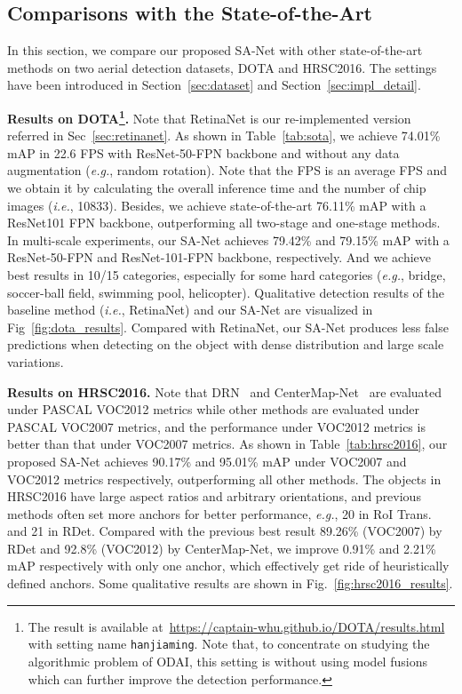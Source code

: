 \documentclass[10pt,journal,final]{IEEEtran}
\def\eg{{\em e.g.}}
\def\ie{{\em i.e.}}
\begin{document}
\subsection{Comparisons with the State-of-the-Art}
In this section, we compare our proposed SA-Net with other state-of-the-art methods on two aerial detection datasets, DOTA and HRSC2016. The settings have been introduced in Section~\ref{sec:dataset} and Section~\ref{sec:impl_detail}. 

{\bf Results on DOTA\footnote{The result is available at~\url{https://captain-whu.github.io/DOTA/results.html} with setting name \texttt{hanjiaming}. Note that, to concentrate on studying the algorithmic problem of ODAI, this setting is without using model fusions which can further improve the detection performance.}.} 
Note that RetinaNet is our re-implemented version referred in Sec~\ref{sec:retinanet}. As shown in Table~\ref{tab:sota}, we achieve 74.01\% mAP in 22.6 FPS with ResNet-50-FPN backbone and without any data augmentation (\eg, random rotation). Note that the FPS is an average FPS and we obtain it by calculating the overall inference time and the number of chip images (\ie, 10833). Besides, we achieve state-of-the-art 76.11\% mAP with a ResNet101 FPN backbone, outperforming all two-stage and one-stage methods. In multi-scale experiments, our SA-Net achieves 79.42\% and 79.15\% mAP with a ResNet-50-FPN and ResNet-101-FPN backbone, respectively. And we achieve best results in 10/15 categories, especially for some hard categories (\eg, bridge, soccer-ball field, swimming pool, helicopter). Qualitative detection results of the baseline method (\ie, RetinaNet) and our SA-Net are visualized in Fig~\ref{fig:dota_results}. Compared with RetinaNet, our SA-Net produces less false predictions when detecting on the object with dense distribution and large scale variations.

{\bf Results on HRSC2016.} Note that DRN~\cite{pan2020dynamic} and CenterMap-Net~\cite{wang2020centermap} are evaluated under PASCAL VOC2012 metrics while other methods are evaluated under PASCAL VOC2007 metrics, and the performance under VOC2012 metrics is better than that under VOC2007 metrics. As shown in Table~\ref{tab:hrsc2016}, our proposed SA-Net achieves 90.17\% and 95.01\% mAP under VOC2007 and VOC2012 metrics respectively, outperforming all other methods. The objects in HRSC2016 have large aspect ratios and arbitrary orientations, and previous methods often set more anchors for better performance, \eg, 20 in RoI Trans. and 21 in RDet. Compared with the previous best result 89.26\% (VOC2007) by RDet and 92.8\% (VOC2012) by CenterMap-Net, we improve 0.91\% and 2.21\% mAP respectively with only one anchor, which effectively get ride of heuristically defined anchors. Some qualitative results are shown in Fig.~\ref{fig:hrsc2016_results}.
\end{document}
